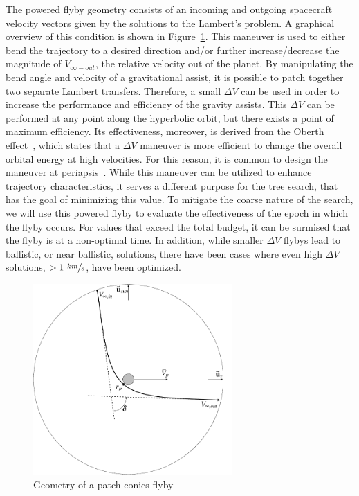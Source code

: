 \documentclass[letterpaper, preprint, paper,11pt]{AAS}	%
\begin{document}
The powered flyby geometry consists of an incoming and outgoing spacecraft velocity vectors given by the solutions to the Lambert’s problem. A graphical overview of this condition is shown in Figure~\ref*{fig:flyby}. This maneuver is used to either bend the trajectory to a desired direction and/or further increase/decrease the magnitude of $V_{\infty-out}$, the relative velocity out of the planet. By manipulating the bend angle and velocity of a gravitational assist, it is possible to patch together two separate Lambert transfers. Therefore, a small $\Delta V$ can be used in order to increase the performance and efficiency of the gravity assists. This $\Delta V$ can be performed at any point along the hyperbolic orbit, but there exists a point of maximum efficiency. Its effectiveness, moreover, is derived from the Oberth effect~\cite{Adams2010}, which states that a $\Delta V$ maneuver is more efficient to change the overall orbital energy at high velocities. For this reason, it is common to design the maneuver at periapsis~\cite{Brennan2015}. While this maneuver can be utilized to enhance trajectory characteristics, it serves a different purpose for the tree search, that has the goal of minimizing this value. To mitigate the coarse nature of the search, we will use this powered flyby to evaluate the effectiveness of the epoch in which the flyby occurs. For values that exceed the total budget, it can be surmised that the flyby is at a non-optimal time. In addition, while smaller $\Delta V$ flybys lead to ballistic, or near ballistic, solutions, there have been cases where even high $\Delta V$ solutions, $> 1 \text{ } \sfrac{km}{s}$, have been optimized.

\begin{figure}[htb]
    \centering
    \includegraphics[width=3in]{fig/flybyGeo.png}
    \setlength{\belowcaptionskip}{-30pt}
    \caption{Geometry of a patch conics flyby}
    \label{fig:flyby}
\end{figure}
\end{document}
